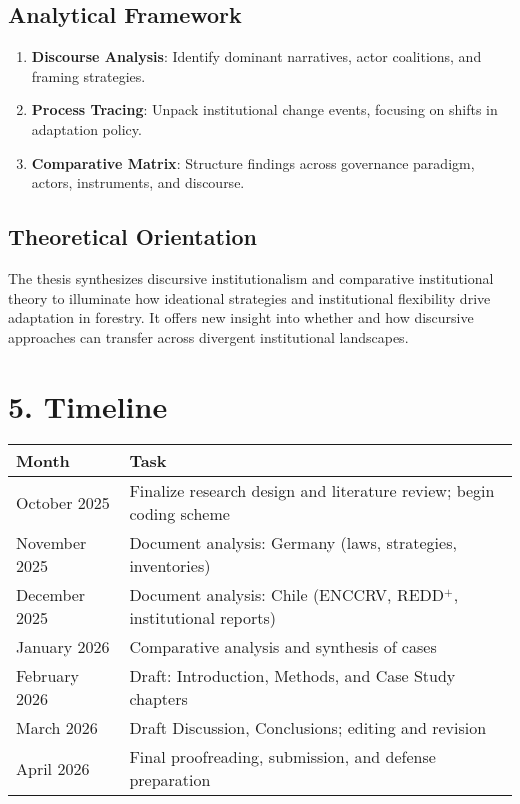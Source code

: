 \subsection*{Analytical Framework}
\begin{enumerate}
  \item \textbf{Discourse Analysis}: Identify dominant narratives, actor coalitions, and framing strategies.
  \item \textbf{Process Tracing}: Unpack institutional change events, focusing on shifts in adaptation policy.
  \item \textbf{Comparative Matrix}: Structure findings across governance paradigm, actors, instruments, and discourse.
\end{enumerate}

\subsection*{Theoretical Orientation}
The thesis synthesizes discursive institutionalism and comparative institutional theory to illuminate how ideational strategies and institutional flexibility drive adaptation in forestry. It offers new insight into whether and how discursive approaches can transfer across divergent institutional landscapes.

\section*{5. Timeline}

\begin{longtable}{@{}ll@{}}
\toprule
\textbf{Month} & \textbf{Task} \\ \midrule
October 2025 & Finalize research design and literature review; begin coding scheme \\
November 2025 & Document analysis: Germany (laws, strategies, inventories) \\
December 2025 & Document analysis: Chile (ENCCRV, REDD$^+$, institutional reports) \\
January 2026 & Comparative analysis and synthesis of cases \\
February 2026 & Draft: Introduction, Methods, and Case Study chapters \\
March 2026 & Draft Discussion, Conclusions; editing and revision \\
April 2026 & Final proofreading, submission, and defense preparation \\
\bottomrule
\end{longtable}
